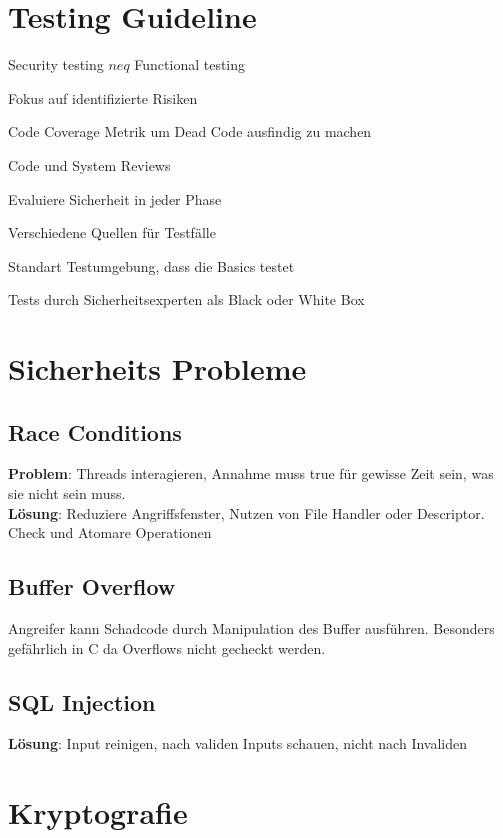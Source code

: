 \section{Testing Guideline}
Security testing $neq$ Functional testing

\begin{compactenum}
    \item Fokus auf identifizierte Risiken
    \item Code Coverage Metrik um Dead Code ausfindig zu machen
    \item Code und System Reviews
    \item Evaluiere Sicherheit in jeder Phase
    \item Verschiedene Quellen für Testfälle
    \item Standart Testumgebung, dass die Basics testet
    \item Tests durch Sicherheitsexperten als Black oder White Box
\end{compactenum}

 \section{Sicherheits Probleme}
 \subsection{Race Conditions}
\textbf{Problem}: Threads interagieren, Annahme muss true für gewisse Zeit sein, was sie nicht sein muss. \\
\textbf{Lösung}: Reduziere Angriffsfenster, Nutzen von File Handler oder Descriptor. Check und Atomare
Operationen

 \subsection{Buffer Overflow}
 Angreifer kann Schadcode durch Manipulation des Buffer ausführen. Besonders gefährlich in C da
 Overflows nicht gecheckt werden.
 \subsection{SQL Injection}
 \textbf{Lösung}: Input reinigen, nach validen Inputs schauen, nicht nach Invaliden


\section{Kryptografie}


